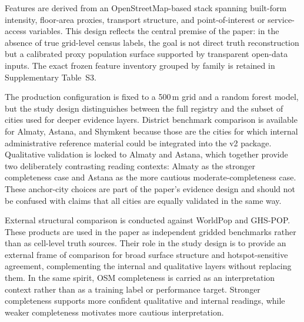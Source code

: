 Features are derived from an OpenStreetMap-based stack spanning built-form intensity, floor-area proxies, transport structure, and point-of-interest or service-access variables. This design reflects the central premise of the paper: in the absence of true grid-level census labels, the goal is not direct truth reconstruction but a calibrated proxy population surface supported by transparent open-data inputs. The exact frozen feature inventory grouped by family is retained in Supplementary Table~S3.

The production configuration is fixed to a 500\,m grid and a random forest model, but the study design distinguishes between the full registry and the subset of cities used for deeper evidence layers. District benchmark comparison is available for Almaty, Astana, and Shymkent because those are the cities for which internal administrative reference material could be integrated into the v2 package. Qualitative validation is locked to Almaty and Astana, which together provide two deliberately contrasting reading contexts: Almaty as the stronger completeness case and Astana as the more cautious moderate-completeness case. These anchor-city choices are part of the paper's evidence design and should not be confused with claims that all cities are equally validated in the same way.

External structural comparison is conducted against WorldPop and GHS-POP. These products are used in the paper as independent gridded benchmarks rather than as cell-level truth sources. Their role in the study design is to provide an external frame of comparison for broad surface structure and hotspot-sensitive agreement, complementing the internal and qualitative layers without replacing them. In the same spirit, OSM completeness is carried as an interpretation context rather than as a training label or performance target. Stronger completeness supports more confident qualitative and internal readings, while weaker completeness motivates more cautious interpretation.


